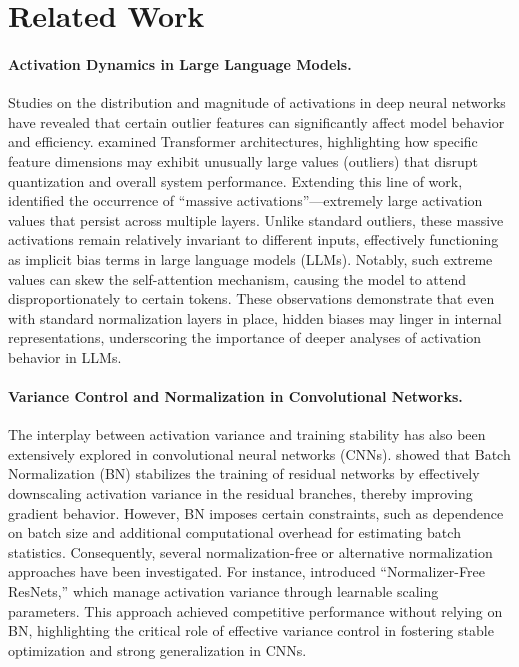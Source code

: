 \onecolumn
\section{Related Work} \label{appendix:relatedwork}
\paragraph{Activation Dynamics in Large Language Models.}
Studies on the distribution and magnitude of activations in deep neural networks have revealed that certain outlier features can significantly affect model behavior and efficiency. \citet{llm.int8} examined Transformer architectures, highlighting how specific feature dimensions may exhibit unusually large values (outliers) that disrupt quantization and overall system performance. Extending this line of work, \citet{massiveactivation} identified the occurrence of ``massive activations''---extremely large activation values that persist across multiple layers. Unlike standard outliers, these massive activations remain relatively invariant to different inputs, effectively functioning as implicit bias terms in large language models (LLMs). Notably, such extreme values can skew the self-attention mechanism, causing the model to attend disproportionately to certain tokens. These observations demonstrate that even with standard normalization layers in place, hidden biases may linger in internal representations, underscoring the importance of deeper analyses of activation behavior in LLMs.

\paragraph{Variance Control and Normalization in Convolutional Networks.}
The interplay between activation variance and training stability has also been extensively explored in convolutional neural networks (CNNs). \citet{cnnvariance} showed that Batch Normalization (BN) stabilizes the training of residual networks by effectively downscaling activation variance in the residual branches, thereby improving gradient behavior. However, BN imposes certain constraints, such as dependence on batch size and additional computational overhead for estimating batch statistics. Consequently, several normalization-free or alternative normalization approaches have been investigated. For instance, \citet{resnet_scale} introduced ``Normalizer-Free ResNets,'' which manage activation variance through learnable scaling parameters. This approach achieved competitive performance without relying on BN, highlighting the critical role of effective variance control in fostering stable optimization and strong generalization in CNNs.


